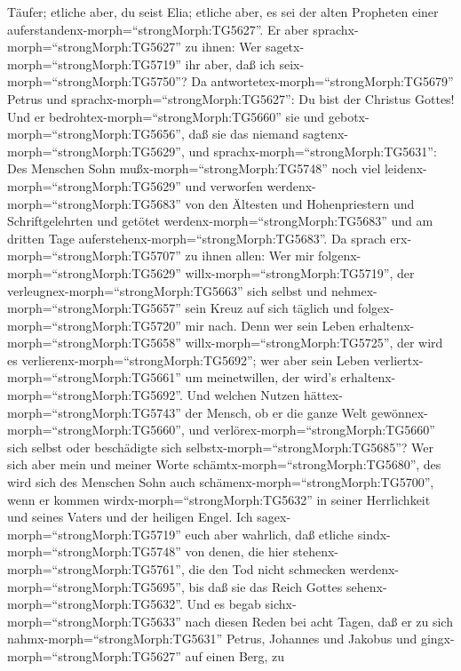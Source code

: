 Täufer; etliche aber, du seist Elia; etliche aber, es sei der alten
Propheten einer auferstandenx-morph=``strongMorph:TG5627''.
 Er aber sprachx-morph=``strongMorph:TG5627'' zu ihnen: Wer
sagetx-morph=``strongMorph:TG5719'' ihr aber, daß ich
seix-morph=``strongMorph:TG5750''? Da
antwortetex-morph=``strongMorph:TG5679'' Petrus und
sprachx-morph=``strongMorph:TG5627'': Du bist der Christus Gottes!
 Und er bedrohtex-morph=``strongMorph:TG5660'' sie und
gebotx-morph=``strongMorph:TG5656'', daß sie das niemand
sagtenx-morph=``strongMorph:TG5629'',  und
sprachx-morph=``strongMorph:TG5631'': Des Menschen Sohn
mußx-morph=``strongMorph:TG5748'' noch viel
leidenx-morph=``strongMorph:TG5629'' und verworfen
werdenx-morph=``strongMorph:TG5683'' von den Ältesten und Hohenpriestern
und Schriftgelehrten und getötet werdenx-morph=``strongMorph:TG5683''
und am dritten Tage auferstehenx-morph=``strongMorph:TG5683''.
 Da sprach erx-morph=``strongMorph:TG5707'' zu ihnen allen:
Wer mir folgenx-morph=``strongMorph:TG5629''
willx-morph=``strongMorph:TG5719'', der
verleugnex-morph=``strongMorph:TG5663'' sich selbst und
nehmex-morph=``strongMorph:TG5657'' sein Kreuz auf sich täglich und
folgex-morph=``strongMorph:TG5720'' mir nach.  Denn wer
sein Leben erhaltenx-morph=``strongMorph:TG5658''
willx-morph=``strongMorph:TG5725'', der wird es
verlierenx-morph=``strongMorph:TG5692''; wer aber sein Leben
verliertx-morph=``strongMorph:TG5661'' um meinetwillen, der wird's
erhaltenx-morph=``strongMorph:TG5692''.  Und welchen Nutzen
hättex-morph=``strongMorph:TG5743'' der Mensch, ob er die ganze Welt
gewönnex-morph=``strongMorph:TG5660'', und
verlörex-morph=``strongMorph:TG5660'' sich selbst oder beschädigte sich
selbstx-morph=``strongMorph:TG5685''?  Wer sich aber mein
und meiner Worte schämtx-morph=``strongMorph:TG5680'', des wird sich des
Menschen Sohn auch schämenx-morph=``strongMorph:TG5700'', wenn er kommen
wirdx-morph=``strongMorph:TG5632'' in seiner Herrlichkeit und seines
Vaters und der heiligen Engel.  Ich
sagex-morph=``strongMorph:TG5719'' euch aber wahrlich, daß etliche
sindx-morph=``strongMorph:TG5748'' von denen, die hier
stehenx-morph=``strongMorph:TG5761'', die den Tod nicht schmecken
werdenx-morph=``strongMorph:TG5695'', bis daß sie das Reich Gottes
sehenx-morph=``strongMorph:TG5632''.  Und es begab
sichx-morph=``strongMorph:TG5633'' nach diesen Reden bei acht Tagen, daß
er zu sich nahmx-morph=``strongMorph:TG5631'' Petrus, Johannes und
Jakobus und gingx-morph=``strongMorph:TG5627'' auf einen Berg, zu
